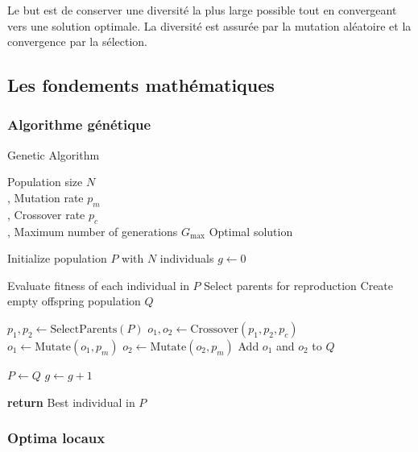 \documentclass[journal, a4paper]{IEEEtran}
\begin{document}
	Le but est de conserver une diversité la plus large possible
	tout en convergeant vers une solution optimale.
	La diversité est assurée par la mutation aléatoire
	et la convergence par la sélection.

	\subsection{Les fondements mathématiques}\label{subsec:les-fondements-mathematiques}

	\subsubsection{Algorithme génétique}
	\begin{center}
	\begin{algorithm}
		  \caption{Genetic Algorithm}\label{alg:ga}
			\Require Population size $N$
			\\ , Mutation rate $p_m$
			\\ , Crossover rate $p_c$
			\\ , Maximum number of generations $G_{\max}$
			\Ensure Optimal solution

			\State Initialize population $P$ with $N$ individuals
			\State $g \gets 0$

			  \State Evaluate fitness of each individual in $P$
			  \State Select parents for reproduction
			  \State Create empty offspring population $Q$

				\State $p_1, p_2 \gets \text{SelectParents}(P)$
				\State $o_1, o_2 \gets \text{Crossover}(p_1, p_2, p_c)$
				\State $o_1 \gets \text{Mutate}(o_1, p_m)$
				\State $o_2 \gets \text{Mutate}(o_2, p_m)$
				\State Add $o_1$ and $o_2$ to $Q$
			  \EndWhile

			  \State $P \gets Q$
			  \State $g \gets g + 1$
			\EndWhile

			\State \textbf{return} Best individual in $P$
	\end{algorithm}
	\end{center}

	\subsubsection{Optima locaux}\label{subsec:extrema-locaux}
%
\end{document}
